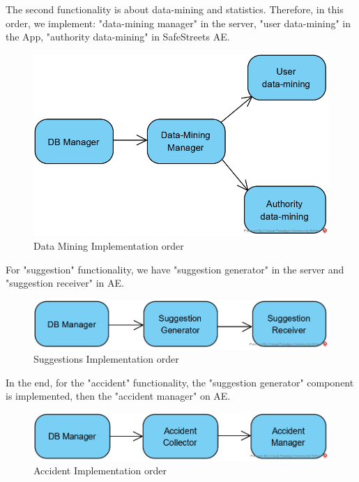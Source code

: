 \documentclass{article}
\begin{document}
		The second functionality is  about data-mining and statistics. Therefore, in this order, we implement: "data-mining manager" in the server, "user data-mining" in the App, "authority data-mining" in SafeStreets AE.\\
		\begin{figure}[H]
			\centering
			\includegraphics [width=\textwidth]{diagrams/datam_impltest.png}
			\caption[Data Mining Implementation order]{Data Mining Implementation order}
			\label{fig:datamining_order}
		\end{figure}
		For "suggestion" functionality, we have "suggestion generator" in the server and "suggestion receiver" in AE.\\
		\begin{figure}[H]
			\centering
			\includegraphics [width=\textwidth]{diagrams/suggestion_impltest.png}
			\caption[Suggestions Implementation order]{Suggestions Implementation order}
			\label{fig:suggestions_order}
		\end{figure}
		In the end, for the "accident" functionality, the "suggestion generator" component is implemented, then the "accident manager" on AE.\\
		\begin{figure}[H]
			\centering
			\includegraphics [width=\textwidth]{diagrams/accident_impltest.png}
			\caption[Accident Implementation order]{Accident Implementation order}
			\label{fig:accident_order}
		\end{figure}
\end{document}
